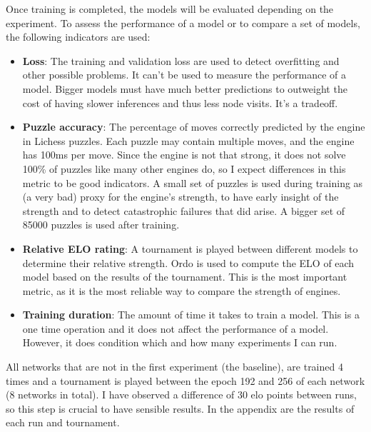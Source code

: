 Once training is completed, the models will be evaluated depending on the experiment. To assess the performance of a model or to compare a set of models, the following indicators are used:

\begin{itemize}
\item \textbf{Loss}: The training and validation loss are used to detect overfitting and other possible problems. It can't be used to measure the performance of a model. Bigger models must have much better predictions to outweight the cost of having slower inferences and thus less node visits. It's a tradeoff.

\item \textbf{Puzzle accuracy}: The percentage of moves correctly predicted by the engine in Lichess puzzles. Each puzzle may contain multiple moves, and the engine has 100ms per move. Since the engine is not that strong, it does not solve 100\% of puzzles like many other engines do, so I expect differences in this metric to be good indicators. A small set of puzzles is used during training as (a very bad) proxy for the engine's strength, to have early insight of the strength and to detect catastrophic failures that did arise. A bigger set of 85000 puzzles is used after training.

\item \textbf{Relative ELO rating}: A tournament is played between different models to determine their relative strength. Ordo is used to compute the ELO of each model based on the results of the tournament. This is the most important metric, as it is the most reliable way to compare the strength of engines.


\item \textbf{Training duration}: The amount of time it takes to train a model. This is a one time operation and it does not affect the performance of a model. However, it does condition which and how many experiments I can run.
\end{itemize}

All networks that are not in the first experiment (the baseline), are trained 4 times and a tournament is played between the epoch 192 and 256 of each network (8 networks in total). I have observed a difference of 30 elo points between runs, so this step is crucial to have sensible results. In the appendix are the results of each run and tournament.

